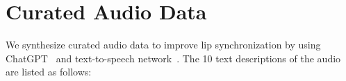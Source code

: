 \section{Curated Audio Data}
We synthesize curated audio data to improve lip synchronization by using ChatGPT~\cite{ChatGPT} and text-to-speech network~\cite{gTTS}. The 10 text descriptions of the audio are listed as follows:

